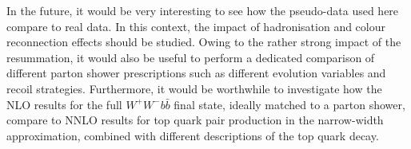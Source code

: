 In the future, it would be very interesting to see how the pseudo-data
used here compare to real data. In this context, the impact of hadronisation
and colour reconnection effects should be studied.
%
Owing to the rather strong impact of the resummation, it would also be useful
to perform a dedicated comparison of different parton shower
prescriptions such as different evolution variables and recoil strategies.
%
Furthermore, it would be worthwhile to investigate how the NLO
results for the full $W^+W^- b\bar{b}$ final state, ideally matched to a
parton shower, compare to NNLO results for top quark pair production in the
narrow-width approximation, combined with different descriptions of the top
quark decay.

